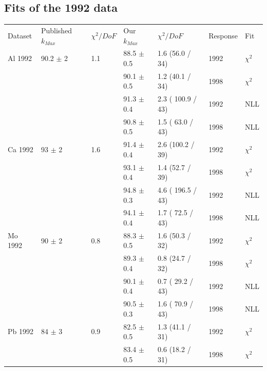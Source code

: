 \subsection { Fits of the 1992 data }
\begin{table}[H]
  \begin{center}
    \begin{tabular}{|l||l|l|l|l|l|l|}
      \hline
      Dataset & Published $k_{Max}$ & $\chi^2 / DoF$ & Our $k_{Max}$ & $\chi^2 / DoF$  & Response & Fit \\
      \hhline{|=||=|=|=|=|=|=|}
       Al 1992   & 90.2 $\pm$ 2   & 1.1 & 88.5 $\pm$ 0.5 &  1.6 (56.0 / 34) & 1992 & $\chi^2$ \\  
                 &                &     & 90.1 $\pm$ 0.5 &  1.2 (40.1 / 34) & 1998 & $\chi^2$ \\  
                                                                             
                 &                &     & 91.3 $\pm$ 0.4 & 2.3 ( 100.9 / 43)& 1992 & NLL \\
                 &                &     & 90.8 $\pm$ 0.5 & 1.5 ( 63.0 / 43) & 1998 & NLL \\
       \hline                                                                
       Ca 1992   & 93   $\pm$ 2   & 1.6 & 91.4 $\pm$ 0.4 &  2.6 (100.2 / 39)& 1992 & $\chi^2$ \\  
                 &                &     & 93.1 $\pm$ 0.4 &  1.4 (52.7 / 39) & 1998 & $\chi^2$ \\  
                                                                             
                 &                &     & 94.8 $\pm$ 0.3 & 4.6 ( 196.5 / 43)& 1992 & NLL \\
                 &                &     & 94.1 $\pm$ 0.4 & 1.7 ( 72.5 / 43) & 1998 & NLL \\
      \hline                                                                 
       Mo 1992   & 90   $\pm$ 2   & 0.8 & 88.3 $\pm$ 0.5 &  1.6 (50.3 / 32) & 1992 & $\chi^2$ \\  
                 &                &     & 89.3 $\pm$ 0.4 &  0.8 (24.7 / 32) & 1998 & $\chi^2$ \\  
                                                                             
                 &                &     & 90.1 $\pm$ 0.4 & 0.7 ( 29.2 / 43) & 1992 & NLL \\
                 &                &     & 90.5 $\pm$ 0.3 & 1.6 ( 70.9 / 43) & 1998 & NLL \\
      \hline                                                                 
       Pb 1992   & 84   $\pm$ 3   & 0.9 & 82.5 $\pm$ 0.5 &  1.3 (41.1 / 31) & 1992 & $\chi^2$ \\  
                 &                &     & 83.4 $\pm$ 0.5 &  0.6 (18.2 / 31) & 1998 & $\chi^2$ \\  
                                                                             

\end{tabular}
\end{center}
\end{table}
